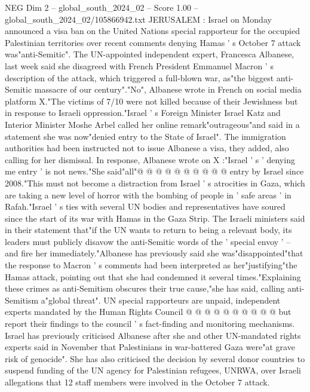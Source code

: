 \begin{textsample}{NEG Dim 2 – global\_south\_2024\_02 – Score 1.00 – global\_south\_2024\_02/105866942.txt}  \label{ex:f2_neg_245}
JERUSALEM : Israel on Monday announced a visa ban on the United Nations special rapporteur for the occupied Palestinian territories over recent comments denying Hamas ' s October 7 attack was"anti-Semitic".
The UN-appointed independent expert, Francesca Albanese, last week said she disagreed with French President Emmanuel Macron ' s description of the attack, which triggered a full-blown war, as"the biggest anti-Semitic massacre of our century"."No", Albanese wrote in French on social media platform X."The victims of 7/10 were not killed because of their Jewishness but in response to Israeli oppression."Israel ' s Foreign Minister Israel Katz and Interior Minister Moshe Arbel called her online remark"outrageous"and said in a statement she was now"denied entry to the State of Israel".
The immigration authorities had been instructed not to issue Albanese a visa, they added, also calling for her dismissal.
In response, Albanese wrote on X :"Israel ' s ' denying me entry ' is not news."She said"all"@ @ @ @ @ @ @ @ @ @ entry by Israel since 2008."This must not become a distraction from Israel ' s atrocities in Gaza, which are taking a new level of horror with the bombing of people in ' safe areas ' in Rafah."Israel ' s ties with several UN bodies and representatives have soured since the start of its war with Hamas in the Gaza Strip.
The Israeli ministers said in their statement that"if the UN wants to return to being a relevant body, its leaders must publicly disavow the anti-Semitic words of the ' special envoy ' -- and fire her immediately."Albanese has previously said she was"disappointed"that the response to Macron ' s comments had been interpreted as her"justifying"the Hamas attack, pointing out that she had condemned it several times."Explaining these crimes as anti-Semitism obscures their true cause,"she has said, calling anti-Semitism a"global threat".
UN special rapporteurs are unpaid, independent experts mandated by the Human Rights Council @ @ @ @ @ @ @ @ @ @ but report their findings to the council ' s fact-finding and monitoring mechanisms.
Israel has previously criticised Albanese after she and other UN-mandated rights experts said in November that Palestinians in war-battered Gaza were"at grave risk of genocide".
She has also criticised the decision by several donor countries to suspend funding of the UN agency for Palestinian refugees, UNRWA, over Israeli allegations that 12 staff members were involved in the October 7 attack.

\end{textsample}
